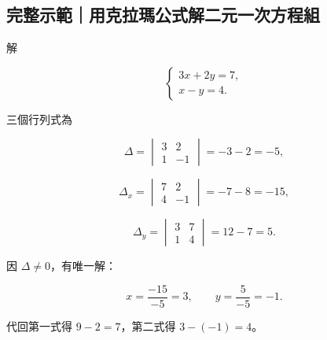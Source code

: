 \documentclass[11pt,a4paper]{article}
\begin{document}
\begin{HandoutWorkedExample}

\subsection{完整示範｜用克拉瑪公式解二元一次方程組}\label{ux5b8cux6574ux793aux7bc4ux7528ux514bux62c9ux746aux516cux5f0fux89e3ux4e8cux5143ux4e00ux6b21ux65b9ux7a0bux7d44}

解

\[
\begin{cases}
3x+2y=7,\\
x-y=4.
\end{cases}
\]

三個行列式為

\[
\Delta=
\begin{vmatrix}
3&2\\
1&-1
\end{vmatrix}
=-3-2=-5,
\]

\[
\Delta_x=
\begin{vmatrix}
7&2\\
4&-1
\end{vmatrix}
=-7-8=-15,
\]

\[
\Delta_y=
\begin{vmatrix}
3&7\\
1&4
\end{vmatrix}
=12-7=5.
\]

因 \(\Delta\ne0\)，有唯一解：

\[
\boxed{x=\frac{-15}{-5}=3,
\qquad
y=\frac5{-5}=-1}.
\]

代回第一式得 \(9-2=7\)，第二式得 \(3-(-1)=4\)。

\end{HandoutWorkedExample}
\end{document}

